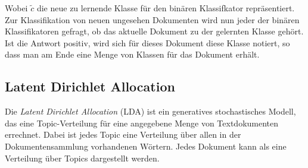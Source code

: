 Wobei $\tilde c$ die neue zu lernende Klasse für den binären Klassifkator repräsentiert.
Zur Klassifikation von neuen ungesehen Dokumenten wird nun jeder der binären Klassifikatoren gefragt, ob das aktuelle Dokument zu der gelernten Klasse gehört.
Ist die Antwort positiv, wird sich für dieses Dokument diese Klasse notiert, so dass man am Ende eine Menge von Klassen für das Dokument erhält.


\subsection{Latent Dirichlet Allocation}
\label{sub:latent_dirichlet_allocation}

Die \emph{Latent Dirichlet Allocation} (LDA) ist ein generatives stochastisches Modell, das eine Topic-Verteilung für eine angegebene Menge von Textdokumenten errechnet.
Dabei ist jedes Topic eine Verteilung über allen in der Dokumentensammlung vorhandenen Wörtern.
Jedes Dokument kann als eine Verteilung über Topics dargestellt werden.




